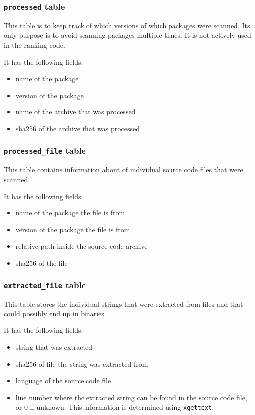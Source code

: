 \documentclass[10pt]{article}
\begin{document}
\subsubsection{\texttt{processed} table}

This table is to keep track of which versions of which packages were scanned.
Its only purpose is to avoid scanning packages multiple times. It is not
actively used in the ranking code.

It has the following fields:

\begin{itemize}
\item name of the package
\item version of the package
\item name of the archive that was processed
\item sha256 of the archive that was processed
\end{itemize}

\subsubsection{\texttt{processed\_file} table}
This table contains information about of individual source code files that were
scanned.

It has the following fields:

\begin{itemize}
\item name of the package the file is from
\item version of the package the file is from
\item relative path inside the source code archive
\item sha256 of the file
\end{itemize}

\subsubsection{\texttt{extracted\_file} table}
This table stores the individual strings that were extracted from files and
that could possibly end up in binaries.

It has the following fields:

\begin{itemize}
\item string that was extracted
\item sha256 of file the string was extracted from
\item language of the source code file
\item line number where the extracted string can be found in the source code
file, or $0$ if unknown. This information is determined using
\texttt{xgettext}.
\end{itemize}
\end{document}
